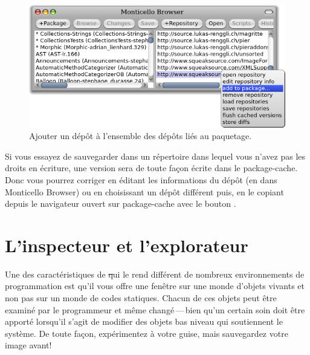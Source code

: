 \documentclass[a4paper,10pt,twoside]{book}
\begin{document}
\begin{figure}[tbp]
	\begin{center}
		\includegraphics[width=\textwidth]{MCaddToPackage}
	\end{center}
	\caption{Ajouter un dépôt à l'ensemble des dépôts liés
au paquetage.}
\end{figure}

Si vous essayez de sauvegarder dans un répertoire dans lequel vous n'avez
pas les droits en écriture, une version sera de toute façon écrite
dans le package-cache.
Donc vous pourrez corriger en éditant les informations du dépôt
(en \actclickant{} dans Monticello Browser) ou
en choisissant un dépôt différent puis, en le copiant
depuis le navigateur ouvert sur package-cache avec le bouton .

\section{L'inspecteur  et l'explorateur} %

Une des caractéristiques de \st qui le rend différent de nombreux 
environnements de programmation est qu'il vous offre une fenêtre 
sur une monde d'objets vivants et non pas sur un monde de codes statiques.
Chacun de ces objets peut être examiné par le programmeur et même
changé\,---\,bien qu'un certain soin doit être apporté lorsqu'il s'agit
de modifier des objets bas niveau qui soutiennent le système.
De toute façon, expérimentez à votre guise, mais sauvegardez votre
image avant!

\end{document}
